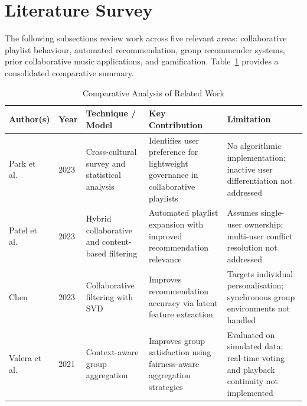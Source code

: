 \documentclass[pdflatex,sn-mathphys-num,iicol]{sn-jnl}
\theoremstyle{thmstyleone}%
\theoremstyle{thmstyletwo}%
\theoremstyle{thmstylethree}%
\begin{document}
\section{Literature Survey}\label{sec:litreview}

The following subsections review work across five relevant areas: collaborative playlist
behaviour, automated recommendation, group recommender systems, prior collaborative music
applications, and gamification. Table~\ref{tab:litreview} provides a consolidated
comparative summary.

\begin{table}[!ht]
\centering
\caption{Comparative Analysis of Related Work}
\label{tab:litreview}
\begin{tabular}{p{2.8cm} p{0.9cm} p{3.0cm} p{3.5cm} p{3.5cm}}
\toprule
\textbf{Author(s)} & \textbf{Year} & \textbf{Technique / Model} & \textbf{Key Contribution} & \textbf{Limitation} \\
\midrule

Park et al.~\cite{jamvote_collaborative_playlists_study}
& 2023
& Cross-cultural survey and statistical analysis
& Identifies user preference for lightweight governance in collaborative playlists
& No algorithmic implementation; inactive user differentiation not addressed \\

\addlinespace

Patel et al.~\cite{jamvote_integrated_playlist}
& 2023
& Hybrid collaborative and content-based filtering
& Automated playlist expansion with improved recommendation relevance
& Assumes single-user ownership; multi-user conflict resolution not addressed \\

\addlinespace

Chen~\cite{jamvote_cf_svd_ieee}
& 2023
& Collaborative filtering with SVD
& Improves recommendation accuracy via latent feature extraction
& Targets individual personalisation; synchronous group environments not handled \\

\addlinespace

Valera et al.~\cite{jamvote_group_context_mdpi}
& 2021
& Context-aware group aggregation
& Improves group satisfaction using fairness-aware aggregation strategies
& Evaluated on simulated data; real-time voting and playback continuity not implemented \\


\end{tabular}
\end{table}
\end{document}

